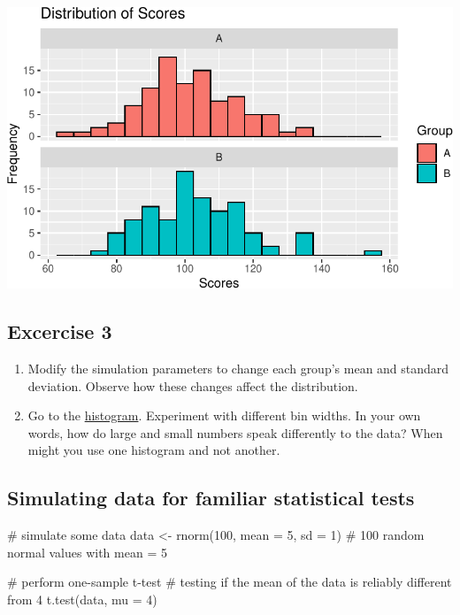 \documentclass[
  singlecolumn]{article}
\newenvironment{Shaded}{}{}
\newcommand{\AttributeTok}[1]{\textcolor[rgb]{0.84,0.23,0.29}{#1}}
\newcommand{\CommentTok}[1]{\textcolor[rgb]{0.42,0.45,0.49}{#1}}
\newcommand{\DecValTok}[1]{\textcolor[rgb]{0.00,0.36,0.77}{#1}}
\newcommand{\FunctionTok}[1]{\textcolor[rgb]{0.44,0.26,0.76}{#1}}
\newcommand{\NormalTok}[1]{\textcolor[rgb]{0.14,0.16,0.18}{#1}}
\newcommand{\OtherTok}[1]{\textcolor[rgb]{0.44,0.26,0.76}{#1}}
\theoremstyle{definition}
\theoremstyle{remark}
\begin{document}
\includegraphics{02-content_files/figure-pdf/unnamed-chunk-6-1.pdf}

\subsection{Excercise 3}\label{excercise-3}

\begin{enumerate}
\def\labelenumi{\arabic{enumi}.}
\item
  Modify the simulation parameters to change each group's mean and
  standard deviation. Observe how these changes affect the distribution.
\item
  Go to the \hyperref[sec-histogram]{histogram}. Experiment with
  different bin widths. In your own words, how do large and small
  numbers speak differently to the data? When might you use one
  histogram and not another.
\end{enumerate}

\subsection{Simulating data for familiar statistical
tests}\label{simulating-data-for-familiar-statistical-tests}

\begin{Shaded}
\begin{Highlighting}[]
\CommentTok{\# simulate some data}
\NormalTok{data }\OtherTok{\textless{}{-}} \FunctionTok{rnorm}\NormalTok{(}\DecValTok{100}\NormalTok{, }\AttributeTok{mean =} \DecValTok{5}\NormalTok{, }\AttributeTok{sd =} \DecValTok{1}\NormalTok{) }\CommentTok{\# 100 random normal values with mean = 5}

\CommentTok{\# perform one{-}sample t{-}test}
\CommentTok{\# testing if the mean of the data is reliably different from 4}
\FunctionTok{t.test}\NormalTok{(data, }\AttributeTok{mu =} \DecValTok{4}\NormalTok{)}
\end{Highlighting}
\end{Shaded}
\end{document}
